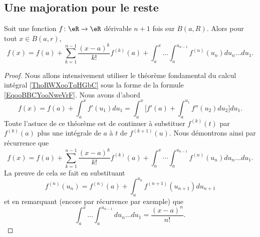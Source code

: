 \subsection{Une majoration pour le reste}

\begin{lemma}       \label{LEMooOVPIooAPWFOm}
    Soit une fonction \( f\colon \eR\to \eR\) dérivable \( n+1\) fois sur \( B(a,R)\). Alors pour tout \( x\in B(a,r)\),
    \begin{equation}
        f(x)=f(a)+\sum_{k=1}^{n-1}\frac{ (x-a)^{k} }{ k! }f^{(k)}(a)+\int_a^{x}\ldots\int_a^{u_{n-1}}f^{(n)}(u_n)du_n\ldots du_1.
    \end{equation}
\end{lemma}

\begin{proof}
    Nous allons intensivement utiliser le théorème fondamental du calcul intégral \ref{ThoRWXooTqHGbC} sous la forme de la formule \eqref{EqooBBCYooNweVrF}. Nous avons d'abord
    \begin{equation}
        f(x)=f(a)+\int_a^x f'(u_1)du_1=\int_a^x\big[ f'(a)+\int_a^{u_1}f''(u_2)du_2 \big]du_1.
    \end{equation}
    Toute l'astuce de ce théorème est de continuer à substituer \( f^{(k)}(t)\) par \( f^{(k)}(a)\) plus une intégrale de \( a\) à \( t\) de \( f^{(k+1)}(u)\). Nous démontrons ainsi par récurrence que
    \begin{equation}        \label{EQooOWJMooHATpMV}
        f(x)=f(a)+\sum_{k=1}^{n-1}\frac{ (x-a)^k }{ k! }f^{(k)}(a)+\int_a^x\cdots\int_a^{u_{n-1}}f^{(n)}(u_n)du_n\ldots du_1.
    \end{equation}
    La preuve de cela se fait en substituant
    \begin{equation}
        f^{(n)}(u_n)=f^{(n)}(a)+\int_{a}^{u_n}f^{(n+1)}(u_{n+1})du_{n+1}
    \end{equation}
    et en remarquant (encore par récurrence par exemple) que
    \begin{equation}
        \int_a^x\ldots \int_a^{u_{n-1}}du_n\ldots du_1=\frac{ (x-a)^n }{ n! }.   
    \end{equation}
\end{proof}


